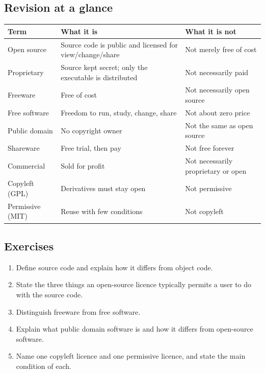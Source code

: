 \subsection*{Revision at a glance}
\begin{center}
\begin{tabular}{p{}p{}p{}}
\toprule
\textbf{Term} & \textbf{What it is} & \textbf{What it is not} \\
\midrule
Open source & Source code is public and licensed for view/change/share & Not merely free of cost \\
Proprietary & Source kept secret; only the executable is distributed & Not necessarily paid \\
Freeware & Free of cost & Not necessarily open source \\
Free software & Freedom to run, study, change, share & Not about zero price \\
Public domain & No copyright owner & Not the same as open source \\
Shareware & Free trial, then pay & Not free forever \\
Commercial & Sold for profit & Not necessarily proprietary or open \\
Copyleft (GPL) & Derivatives must stay open & Not permissive \\
Permissive (MIT) & Reuse with few conditions & Not copyleft \\
\bottomrule
\end{tabular}
\end{center}

\subsection*{Exercises}
\begin{enumerate}[label=\arabic*.]
  \item Define source code and explain how it differs from object code.
  \item State the three things an open-source licence typically permits a user
    to do with the source code.
  \item Distinguish freeware from free software.
  \item Explain what public domain software is and how it differs from
    open-source software.
  \item Name one copyleft licence and one permissive licence, and state the
    main condition of each.
\end{enumerate}

